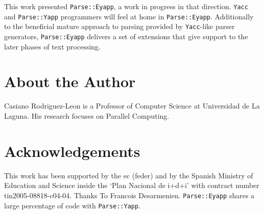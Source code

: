 \documentclass[times, 10pt,twocolumn]{article}
\newcommand{\code}[1]{{\tt #1}}
\begin{document}
This work presented \code{Parse::Eyapp}, a work in progress in that direction.
\code{Yacc} and \code{Parse::Yapp} programmers will feel at home
in \code{Parse::Eyapp}. 
Additionally to the beneficial mature approach to parsing provided by
\code{Yacc}-like parser generators,
\code{Parse::Eyapp} delivers a set of extensions
that give support to the later phases
of text processing.

\section{About the Author}
Casiano Rodriguez-Leon is a Professor of Computer Science at Universidad
de La Laguna. His research focuses on Parallel Computing. 


\section{Acknowledgements}

This work has been supported by the {\sc ec (feder)} and by
the Spanish Ministry of Education and Science inside the
`Plan Nacional de {\sc i+d+}i' with contract number {\sc tin2005-08818-c04-04}.
Thanks To Francois Desarmenien. \code{Parse::Eyapp} shares a large percentage 
of code with \code{Parse::Yapp}.





\label{end:of:file}
\end{document}
